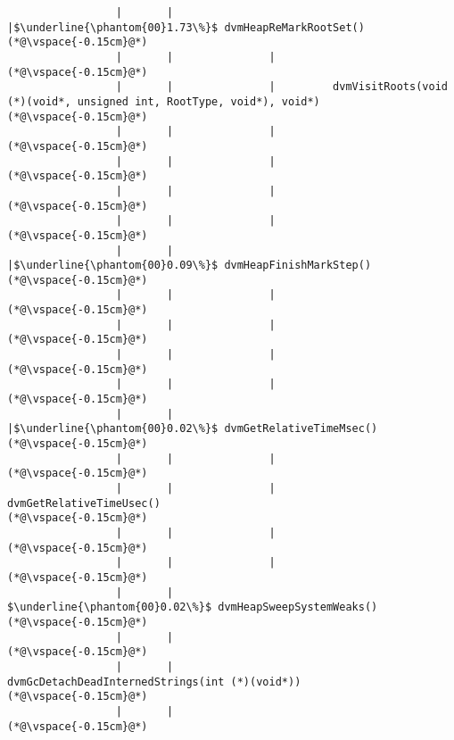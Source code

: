 \begin{lstlisting}
                 |       |               |$\underline{\phantom{00}1.73\%}$ dvmHeapReMarkRootSet()
(*@\vspace{-0.15cm}@*)
                 |       |               |
(*@\vspace{-0.15cm}@*)
                 |       |               |         dvmVisitRoots(void (*)(void*, unsigned int, RootType, void*), void*)
(*@\vspace{-0.15cm}@*)
                 |       |               |        
(*@\vspace{-0.15cm}@*)
                 |       |               |        
(*@\vspace{-0.15cm}@*)
                 |       |               |
(*@\vspace{-0.15cm}@*)
                 |       |               |
(*@\vspace{-0.15cm}@*)
                 |       |               |$\underline{\phantom{00}0.09\%}$ dvmHeapFinishMarkStep()
(*@\vspace{-0.15cm}@*)
                 |       |               |        
(*@\vspace{-0.15cm}@*)
                 |       |               |        
(*@\vspace{-0.15cm}@*)
                 |       |               |
(*@\vspace{-0.15cm}@*)
                 |       |               |
(*@\vspace{-0.15cm}@*)
                 |       |               |$\underline{\phantom{00}0.02\%}$ dvmGetRelativeTimeMsec()
(*@\vspace{-0.15cm}@*)
                 |       |               |
(*@\vspace{-0.15cm}@*)
                 |       |               |       dvmGetRelativeTimeUsec()
(*@\vspace{-0.15cm}@*)
                 |       |               |
(*@\vspace{-0.15cm}@*)
                 |       |               |
(*@\vspace{-0.15cm}@*)
                 |       |                $\underline{\phantom{00}0.02\%}$ dvmHeapSweepSystemWeaks()
(*@\vspace{-0.15cm}@*)
                 |       |
(*@\vspace{-0.15cm}@*)
                 |       |                       dvmGcDetachDeadInternedStrings(int (*)(void*))
(*@\vspace{-0.15cm}@*)
                 |       |
(*@\vspace{-0.15cm}@*)

\end{lstlisting}
